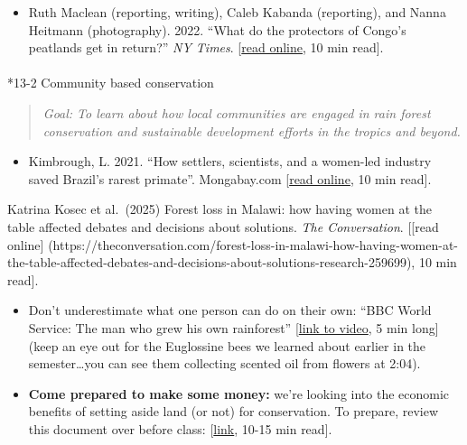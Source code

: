 \documentclass[
  10pt,
  letterpaper,
  oneside,
  open=any]{scrbook}
\makeatletter
\let\oldparagraph\paragraph
\renewcommand{\paragraph}{
    \@ifstar
      \xxxParagraphStar
      \xxxParagraphNoStar
  }
\newcommand{\xxxParagraphStar}[1]{\oldparagraph*{#1}\mbox{}}
\newcommand{\xxxParagraphNoStar}[1]{\oldparagraph{#1}\mbox{}}
\providecommand{\tightlist}{%
  \setlength{\itemsep}{0pt}\setlength{\parskip}{0pt}}
\makeatother
\begin{document}
\begin{itemize}
\tightlist
\item
  Ruth Maclean (reporting, writing), Caleb Kabanda (reporting), and
  Nanna Heitmann (photography). 2022. ``What do the protectors of
  Congo's peatlands get in return?'' \emph{NY Times}.
  {[}\href{https://www.nytimes.com/interactive/2022/02/21/headway/peatlands-congo-climate-change.html}{read
  online}, 10 min read{]}.
\end{itemize}

\paragraph*{13-2 Community based
conservation}\label{community-based-conservation}

\begin{quote}
\emph{Goal: To learn about how local communities are engaged in rain
forest conservation and sustainable development efforts in the tropics
and beyond.}
\end{quote}

\begin{itemize}
\tightlist
\item
  Kimbrough, L. 2021. ``How settlers, scientists, and a women-led
  industry saved Brazil's rarest primate''. Mongabay.com
  {[}\href{https://news.mongabay.com/2021/05/how-settlers-scientists-and-a-women-led-industry-saved-brazils-rarest-primate/}{read
  online}, 10 min read{]}.
\end{itemize}

Katrina Kosec et al.~(2025) Forest loss in Malawi: how having women at
the table affected debates and decisions about solutions. \emph{The
Conversation}. {[}{[}read online{]}
(https://theconversation.com/forest-loss-in-malawi-how-having-women-at-the-table-affected-debates-and-decisions-about-solutions-research-259699),
10 min read{]}.

\begin{itemize}
\item
  Don't underestimate what one person can do on their own: ``BBC World
  Service: The man who grew his own rainforest''
  {[}\href{https://www.youtube.com/watch?v=AngaeIf78AQ}{link to video},
  5 min long{]} (keep an eye out for the Euglossine bees we learned
  about earlier in the semester\ldots you can see them collecting
  scented oil from flowers at 2:04).
\item
  \textbf{Come prepared to make some money:} we're looking into the
  economic benefits of setting aside land (or not) for conservation. To
  prepare, review this document over before class:
  {[}\href{https://www.tandfonline.com/doi/full/10.1080/00220485.2016.1146098}{link},
  10-15 min read{]}.
\end{itemize}
\end{document}
